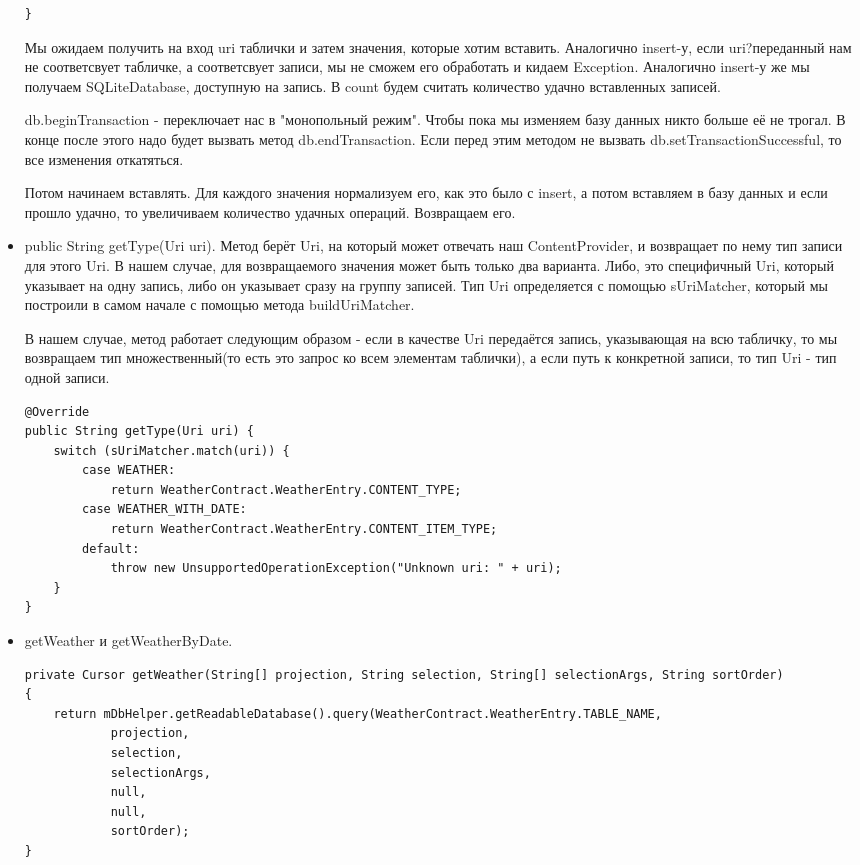 \documentclass[12 pt]{article}
\begin{document}
\begin{itemize}
\begin{lstlisting}
}	    
	    \end{lstlisting}
	    
	    Мы ожидаем получить на вход uri таблички и затем значения, которые хотим вставить. Аналогично insert-у, если uri?переданный нам не соответсвует табличке, а соответсвует записи, мы не сможем его обработать и кидаем Exception. Аналогично insert-у же мы получаем SQLiteDatabase, доступную на запись. В count будем считать количество удачно вставленных записей. 
	    
	    db.beginTransaction - переключает нас в "монопольный режим". Чтобы пока мы изменяем базу данных никто больше её не трогал. В конце после этого надо будет вызвать метод db.endTransaction. Если перед этим методом не вызвать db.setTransactionSuccessful, то все изменения откатяться.
	    
	    Потом начинаем вставлять. Для каждого значения нормализуем его, как это было с insert, а потом вставляем в базу данных и если прошло удачно, то увеличиваем количество удачных операций. Возвращаем его.
	    
	    \item public String getType(Uri uri). Метод берёт Uri, на который может отвечать наш ContentProvider, и возвращает по нему тип записи для этого Uri. В нашем случае, для возвращаемого значения может быть только два варианта. Либо, это специфичный Uri, который указывает на одну запись, либо он указывает сразу на группу записей. Тип Uri определяется с помощью sUriMatcher, который мы построили в самом начале с помощью метода buildUriMatcher.
	    
	    В нашем случае, метод работает следующим образом - если в качестве Uri передаётся запись, указывающая на всю табличку, то мы возвращаем тип множественный(то есть это запрос ко всем элементам таблички), а если путь к конкретной записи, то тип Uri - тип одной записи.
	    
        \begin{lstlisting}
@Override
public String getType(Uri uri) {
    switch (sUriMatcher.match(uri)) {
        case WEATHER:
            return WeatherContract.WeatherEntry.CONTENT_TYPE;
        case WEATHER_WITH_DATE:
            return WeatherContract.WeatherEntry.CONTENT_ITEM_TYPE;
        default:
            throw new UnsupportedOperationException("Unknown uri: " + uri);
    }
}
	    \end{lstlisting}
	        	
	    \item getWeather и getWeatherByDate.
    	\begin{lstlisting}
private Cursor getWeather(String[] projection, String selection, String[] selectionArgs, String sortOrder)
{
    return mDbHelper.getReadableDatabase().query(WeatherContract.WeatherEntry.TABLE_NAME,
            projection,
            selection,
            selectionArgs,
            null,
            null,
            sortOrder);
}


\end{lstlisting}
\end{itemize}
\end{document}
